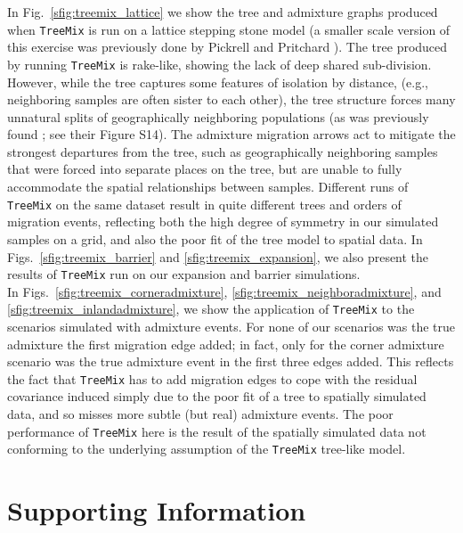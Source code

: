 \documentclass[10pt,letterpaper]{article}
\begin{document}
In Fig.\ \ref{sfig:treemix_lattice} we show the tree and admixture graphs produced when
\texttt{TreeMix} is run on a lattice stepping stone model 
(a smaller scale version of this exercise was previously done by Pickrell and Pritchard \cite{Treemix}). 
The tree produced by running \texttt{TreeMix} is rake-like, showing the lack of deep shared sub-division. 
However, while the tree captures some features of isolation by distance, 
(e.g., neighboring samples are often sister to each other), 
the tree structure forces many unnatural splits of geographically neighboring populations 
(as was previously found \cite{Treemix}; see their Figure S14). 
The admixture migration arrows act to mitigate the strongest departures from the tree, 
such as geographically neighboring samples that were forced into separate places on the tree,
but are unable to fully accommodate the spatial relationships between samples. 
 Different runs of \texttt{TreeMix} on the same dataset result in quite different trees and orders of migration events, 
 reflecting both the high degree of symmetry in our simulated samples on a grid, 
 and also the poor fit of the tree model to spatial data. 
In Figs.\ \ref{sfig:treemix_barrier} and \ref{sfig:treemix_expansion},
we also present the results of \texttt{TreeMix} run on our expansion and barrier simulations.\\

In Figs.\ \ref{sfig:treemix_corneradmixture}, \ref{sfig:treemix_neighboradmixture}, and \ref{sfig:treemix_inlandadmixture},
we show the application of \texttt{TreeMix} to the scenarios simulated with admixture events.  
For none of our scenarios was the true admixture the first migration edge added; 
in fact, only for the corner admixture scenario was the true admixture
event in the first three edges added. 
This reflects the fact that \texttt{TreeMix} has to add migration edges to cope with the residual
covariance induced simply due to the poor fit of a tree to spatially simulated data,
and so misses more subtle (but real) admixture events.
The poor performance of \texttt{TreeMix} here is the result of the 
spatially simulated data not conforming to the 
underlying assumption of the \texttt{TreeMix} tree-like model.


\section*{Supporting Information}

\end{document}
